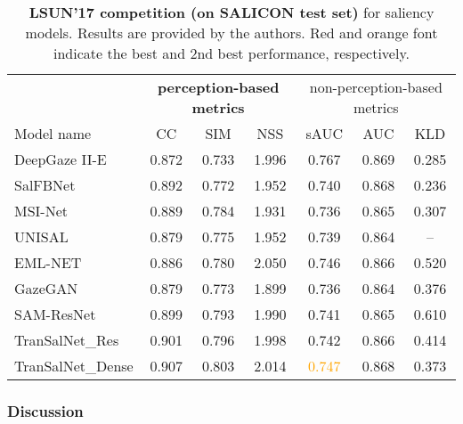 \documentclass{article}
\begin{document}
\begin{table}[]
\caption{\textbf{LSUN'17 competition (on SALICON test set)} for saliency models. Results are provided by the authors. {\color{red}Red} and {\color{orange}orange} font indicate the best and 2nd best performance, respectively.}\label{tb:perf_comp_SALICON}
\centering
\renewcommand{\arraystretch}{1.2}
\begin{adjustbox}{width=0.48\textwidth}
\begin{tabular}{l|c c c c c c }
\toprule

& \multicolumn{3}{c|}{\textbf{perception-based metrics}}              
& \multicolumn{3}{c}{non-perception-based metrics} \\
Model name & CC  & SIM  & \multicolumn{1}{c|}{NSS } & sAUC  &  AUC  &  KLD  \\ \midrule \midrule

DeepGaze II-E~\cite{DP2E}& 0.872 & 0.733 & \multicolumn{1}{c|}{1.996} & {\color{red}0.767} & {\color{red}0.869} &{\color{orange}0.285}\\
SalFBNet~\cite{SalFBNet}&  0.892 &  0.772 & \multicolumn{1}{c|}{1.952} & 0.740 & {\color{orange}0.868} &{\color{red}0.236}\\
MSI-Net~\cite{MSI-Net}& 0.889 & 0.784 & \multicolumn{1}{c|}{1.931} & 0.736 & 0.865 &0.307\\
UNISAL~\cite{UNISAL}& 0.879 & 0.775 & \multicolumn{1}{c|}{1.952} & 0.739 & 0.864 & -- \\
EML-NET~\cite{EML-NET}& 0.886 & 0.780 & \multicolumn{1}{c|}{{\color{red}2.050}} & 0.746 & 0.866 & 0.520 \\
GazeGAN~\cite{GAZEGAN}& 0.879 & 0.773 & \multicolumn{1}{c|}{1.899} & 0.736 & 0.864 &0.376\\
SAM-ResNet~\cite{SAM_Cornia}& 0.899  &0.793 & \multicolumn{1}{c|}{1.990}  & 0.741 & 0.865 & 0.610 \\
\midrule
TranSalNet\_Res & {\color{orange}0.901} & {\color{orange}0.796} & \multicolumn{1}{c|}{1.998} & 0.742 & 0.866 & 0.414 \\ 
TranSalNet\_Dense & {\color{red}0.907} & {\color{red}0.803} & \multicolumn{1}{c|}{{\color{orange}2.014}} & \textcolor{orange}{0.747} & {\color{orange}0.868} & 0.373 \\ 
\bottomrule
\end{tabular}
\end{adjustbox}
\end{table}

\subsubsection{Discussion}
\end{document}
